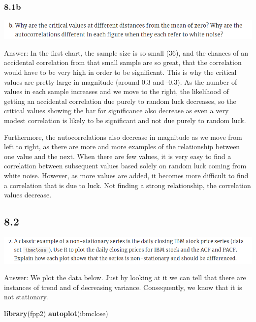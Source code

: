 \documentclass[]{book}
\newenvironment{Shaded}{\begin{snugshade}}{\end{snugshade}}
\newcommand{\KeywordTok}[1]{\textcolor[rgb]{0.13,0.29,0.53}{\textbf{#1}}}
\newcommand{\NormalTok}[1]{#1}
\begin{document}
\hypertarget{b-7}{%
\subsubsection{8.1b}\label{b-7}}

\includegraphics{./week5/8.1b.png}

Answer: In the first chart, the sample size is so small (36), and the chances of an accidental correlation from that small sample are so great, that the correlation would have to be very high in order to be significant. This is why the critical values are pretty large in magnitude (around 0.3 and -0.3). As the number of values in each sample increases and we move to the right, the likelihood of getting an accidental correlation due purely to random luck decreases, so the critical values showing the bar for significance also decrease as even a very modest correlation is likely to be significant and not due purely to random luck.

Furthermore, the autocorrelations also decrease in magnitude as we move from left to right, as there are more and more examples of the relationship between one value and the next. When there are few values, it is very easy to find a correlation between subsequent values based solely on random luck coming from white noise. However, as more values are added, it becomes more difficult to find a correlation that is due to luck. Not finding a strong relationship, the correlation values decrease.

\hypertarget{section-13}{%
\subsection{8.2}\label{section-13}}

\includegraphics{./week5/8.2.png}

Answer: We plot the data below. Just by looking at it we can tell that there are instances of trend and of decreasing variance. Consequently, we know that it is not stationary.

\begin{Shaded}
\begin{Highlighting}[]
\KeywordTok{library}\NormalTok{(fpp2)}
\KeywordTok{autoplot}\NormalTok{(ibmclose)}
\end{Highlighting}
\end{Shaded}
\end{document}
